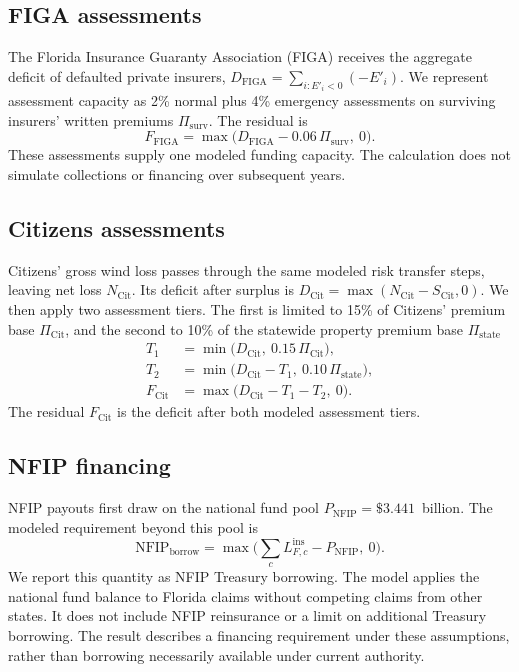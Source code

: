 \subsection*{FIGA assessments}
The Florida Insurance Guaranty Association (FIGA) receives the aggregate deficit of defaulted private insurers, $D_{\mathrm{FIGA}}=\sum_{i:E'_i<0}(-E'_i)$. We represent assessment capacity as 2\% normal plus 4\% emergency assessments on surviving insurers' written premiums $\Pi_{\mathrm{surv}}$. The residual is
\begin{equation}
F_{\mathrm{FIGA}} = \max\!\big(D_{\mathrm{FIGA}} - 0.06\,\Pi_{\mathrm{surv}},\ 0\big).
\end{equation}
These assessments supply one modeled funding capacity. The calculation does not simulate collections or financing over subsequent years.

\subsection*{Citizens assessments}
Citizens' gross wind loss passes through the same modeled risk transfer steps, leaving net loss $N_{\mathrm{Cit}}$. Its deficit after surplus is $D_{\mathrm{Cit}}=\max(N_{\mathrm{Cit}}-S_{\mathrm{Cit}},0)$. We then apply two assessment tiers. The first is limited to 15\% of Citizens' premium base $\Pi_{\mathrm{Cit}}$, and the second to 10\% of the statewide property premium base $\Pi_{\mathrm{state}}$
\begin{align}
T_1 &= \min\!\big(D_{\mathrm{Cit}},\ 0.15\,\Pi_{\mathrm{Cit}}\big), \\
T_2 &= \min\!\big(D_{\mathrm{Cit}} - T_1,\ 0.10\,\Pi_{\mathrm{state}}\big), \\
F_{\mathrm{Cit}} &= \max\!\big(D_{\mathrm{Cit}} - T_1 - T_2,\ 0\big).
\end{align}
The residual $F_{\mathrm{Cit}}$ is the deficit after both modeled assessment tiers.

\subsection*{NFIP financing}
NFIP payouts first draw on the national fund pool $P_{\mathrm{NFIP}}=\$3.441$~billion. The modeled requirement beyond this pool is
\begin{equation}
\mathrm{NFIP}_{\mathrm{borrow}} = \max\!\Big(\textstyle\sum_c L^{\mathrm{ins}}_{F,c} - P_{\mathrm{NFIP}},\ 0\Big).
\end{equation}
We report this quantity as NFIP Treasury borrowing. The model applies the national fund balance to Florida claims without competing claims from other states. It does not include NFIP reinsurance or a limit on additional Treasury borrowing. The result describes a financing requirement under these assumptions, rather than borrowing necessarily available under current authority.


